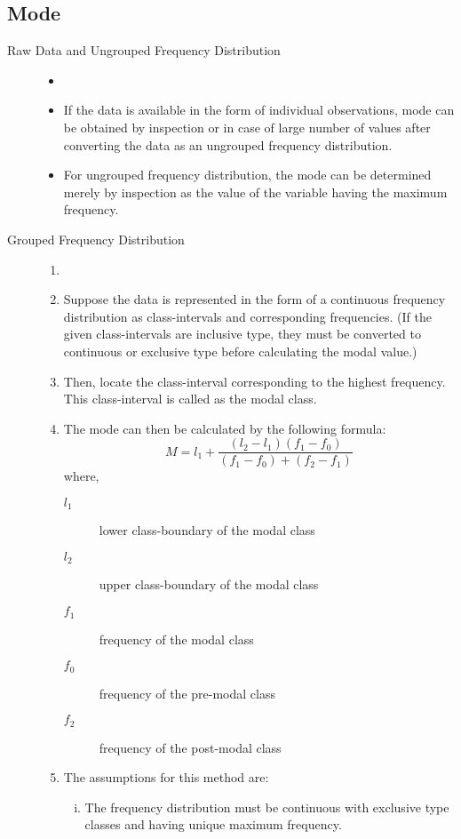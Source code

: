 \documentclass[
10pt, %
a4paper, %
]{report}
\begin{document}
\subsection{Mode}
\begin{description}
\item[Raw Data and Ungrouped Frequency Distribution]
\begin{itemize}
\item[]
\item If the data is available in the form of individual observations, mode can be obtained by inspection or in case of large number of values after converting the data as an ungrouped frequency distribution.
\item For ungrouped frequency distribution, the mode can be determined merely by inspection as the value of the variable having the maximum frequency.
\end{itemize}
\item[Grouped Frequency Distribution]
\begin{enumerate}[Step 1.]
\item[]
\item Suppose the data is represented in the form of a continuous frequency distribution as class-intervals and corresponding frequencies. (If the given class-intervals are inclusive type, they must be converted to continuous or exclusive type before calculating the modal value.)
\item Then, locate the class-interval corresponding to the highest frequency. This class-interval is called as the modal class.
\item The mode can then be calculated by the following formula:
\[
M = l_1 + \frac{(l_2 - l_1)(f_1 - f_0)}{(f_1-f_0)+(f_2-f_1)}
\]
where,
\begin{description}
\item[\(l_1\)] lower class-boundary of the modal class
\item[\(l_2\)] upper class-boundary of the modal class
\item[\(f_1\)] frequency of the modal class
\item[\(f_0\)] frequency of the pre-modal class
\item[\(f_2\)] frequency of the post-modal class
\end{description}
\item The assumptions for this method are:
\begin{enumerate}[i.]
\item The frequency distribution must be continuous with exclusive type classes and having unique maximum frequency.

\end{enumerate}
\end{enumerate}
\end{description}
\end{document}
